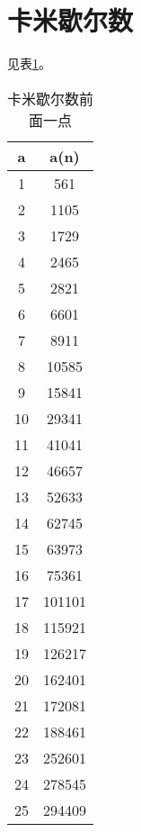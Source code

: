 \section{卡米歇尔数}
见表\ref{tab:Carmichael-numbers}。
\begin{table}[!htbp]
\centering
\caption{卡米歇尔数前面一点 \label{tab:Carmichael-numbers}}
\begin{tabular}{|c|c|}
\hline
a  & a(n)   \\ \hline
1  & 561    \\ \hline
2  & 1105   \\ \hline
3  & 1729   \\ \hline
4  & 2465   \\ \hline
5  & 2821   \\ \hline
6  & 6601   \\ \hline
7  & 8911   \\ \hline
8  & 10585  \\ \hline
9  & 15841  \\ \hline
10 & 29341  \\ \hline
11 & 41041  \\ \hline
12 & 46657  \\ \hline
13 & 52633  \\ \hline
14 & 62745  \\ \hline
15 & 63973  \\ \hline
16 & 75361  \\ \hline
17 & 101101 \\ \hline
18 & 115921 \\ \hline
19 & 126217 \\ \hline
20 & 162401 \\ \hline
21 & 172081 \\ \hline
22 & 188461 \\ \hline
23 & 252601 \\ \hline
24 & 278545 \\ \hline
25 & 294409 \\ \hline
\end{tabular}
\end{table}

